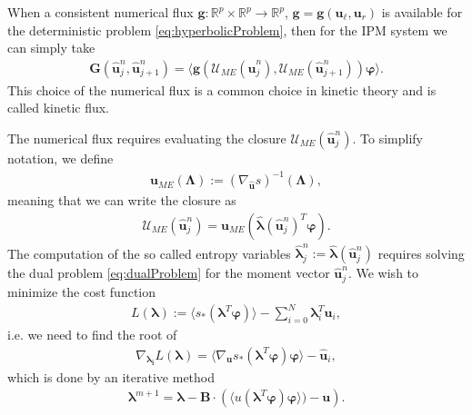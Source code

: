 When a consistent numerical flux $\bm g:\mathbb{R}^p\times\mathbb{R}^p\to\mathbb{R}^p$, $\bm g = \bm g(\bm u_\ell, \bm u_r)$ is available for the deterministic problem \eqref{eq:hyperbolicProblem}, then for the IPM system we can simply take
\begin{align*}
 \bm{G}(\bm{\hat u}_{j}^n,\bm{\hat u}_{j+1}^{n}) = \langle \bm g(\mathcal{U}_{ME}(\bm{\hat u}_j^n),\mathcal{U}_{ME}(\bm{\hat u}_{j+1}^n))\bm{\varphi}\rangle.
\end{align*}
This choice of the numerical flux is a common choice in kinetic theory and is called kinetic flux.

The numerical flux requires evaluating the closure $\mathcal{U}_{ME}(\bm{\hat u}_j^n)$. To simplify notation, we define
\begin{align*}
\bm{u}_{ME}(\bm\Lambda):=\left( \nabla_{\bm{\hat u}} s \right)^{-1}(\bm\Lambda),
\end{align*}
meaning that we can write the closure as
\begin{align*}
\mathcal{U}_{ME}(\bm{\hat u}_j^n) = \bm{u}_{ME}(\bm{\hat{\lambda}}(\bm{\hat u}_j^n)^T \bm{\varphi}).
\end{align*}
The computation of the so called entropy variables $\bm{\hat\lambda}_j^n:=\bm{\hat\lambda}(\bm{\hat u}_j^n)$ requires solving the dual problem \eqref{eq:dualProblem} for the moment vector $\bm{\hat u}_{j}^{n}$. We wish to minimize the cost function
\begin{align*}
L(\bm{\lambda}) := \langle s_*(\bm{\lambda}^T \bm\varphi)\rangle - \sum_{i=0}^{N}\bm{\lambda}_i^T \bm{\hat u}_i,
\end{align*}
i.e. we need to find the root of
\begin{align*}
\nabla_{\bm{\lambda_i}}L(\bm{\lambda}) = \langle \nabla_{\bm{u}}s_*(\bm{\lambda}^T \bm\varphi)\bm\varphi\rangle - \bm{\hat u}_i,
\end{align*}
which is done by an iterative method
\begin{align}\label{eq:dualIteration1}
\bm{\lambda}^{m+1} = \bm{\lambda}-\bm{B}\cdot \left(\langle u(\bm{\lambda}^T\bm{\varphi})\bm{\varphi}\rangle)-\bm{u}\right).
\end{align}



